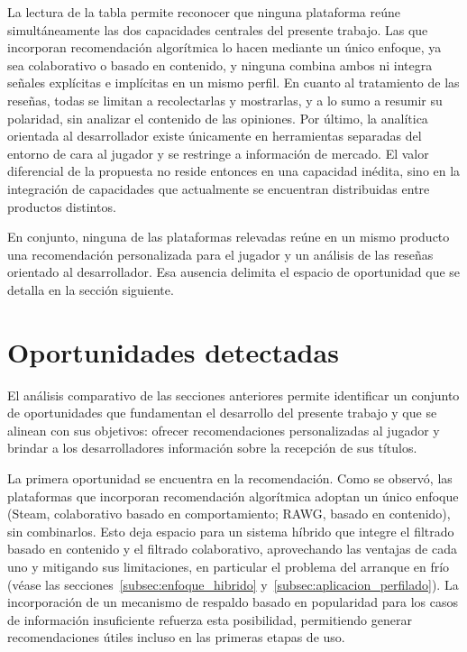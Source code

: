 La lectura de la tabla permite reconocer que ninguna plataforma reúne simultáneamente las dos capacidades centrales del presente trabajo. Las que incorporan recomendación algorítmica lo hacen mediante un único enfoque, ya sea colaborativo o basado en contenido, y ninguna combina ambos ni integra señales explícitas e implícitas en un mismo perfil. En cuanto al tratamiento de las reseñas, todas se limitan a recolectarlas y mostrarlas, y a lo sumo a resumir su polaridad, sin analizar el contenido de las opiniones. Por último, la analítica orientada al desarrollador existe únicamente en herramientas separadas del entorno de cara al jugador y se restringe a información de mercado. El valor diferencial de la propuesta no reside entonces en una capacidad inédita, sino en la integración de capacidades que actualmente se encuentran distribuidas entre productos distintos.

En conjunto, ninguna de las plataformas relevadas reúne en un mismo producto una recomendación personalizada para el jugador y un análisis de las reseñas orientado al desarrollador. Esa ausencia delimita el espacio de oportunidad que se detalla en la sección siguiente.

\section{Oportunidades detectadas}\label{sec:oportunidades}

El análisis comparativo de las secciones anteriores permite identificar un conjunto de oportunidades que fundamentan el desarrollo del presente trabajo y que se alinean con sus objetivos: ofrecer recomendaciones personalizadas al jugador y brindar a los desarrolladores información sobre la recepción de sus títulos.

La primera oportunidad se encuentra en la recomendación. Como se observó, las plataformas que incorporan recomendación algorítmica adoptan un único enfoque (Steam, colaborativo basado en comportamiento; RAWG, basado en contenido), sin combinarlos. Esto deja espacio para un sistema híbrido que integre el filtrado basado en contenido y el filtrado colaborativo, aprovechando las ventajas de cada uno y mitigando sus limitaciones, en particular el problema del arranque en frío (véase las secciones~\ref{subsec:enfoque_hibrido} y~\ref{subsec:aplicacion_perfilado}). La incorporación de un mecanismo de respaldo basado en popularidad para los casos de información insuficiente refuerza esta posibilidad, permitiendo generar recomendaciones útiles incluso en las primeras etapas de uso.

